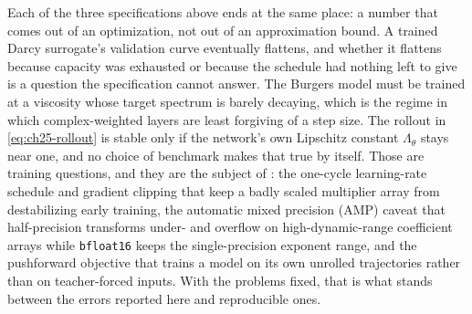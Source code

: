 \bigskip
\noindent Each of the three specifications above ends at the same place: a number
that comes out of an optimization, not out of an approximation bound. A trained
Darcy surrogate's validation curve eventually flattens, and whether it flattens
because capacity was exhausted or because the schedule had nothing left to give is a
question the specification cannot answer. The Burgers model must be trained at a
viscosity whose target spectrum is barely decaying, which is the regime in which
complex-weighted layers are least forgiving of a step size. The rollout in
\eqref{eq:ch25-rollout} is stable only if the network's own Lipschitz constant
$\Lambda_{\theta}$ stays near one, and no choice of benchmark makes that true by
itself. Those are training questions, and they are the subject of
: the one-cycle
learning-rate schedule and gradient clipping that keep a badly scaled multiplier
array from destabilizing early training, the automatic mixed precision (AMP)
caveat that half-precision transforms under- and overflow on high-dynamic-range
coefficient arrays while \texttt{bfloat16} keeps the single-precision exponent
range, and the pushforward objective that trains a model
on its own unrolled trajectories rather than on teacher-forced inputs. With the
problems fixed, that is what stands between the errors reported here and
reproducible ones.
